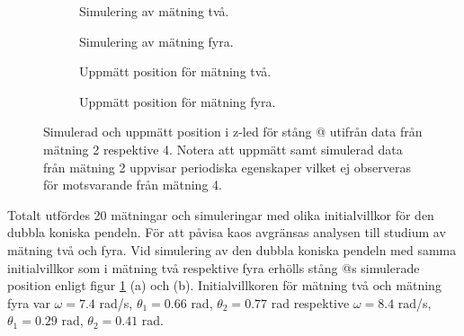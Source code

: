 \documentclass[12pt,a4paper]{article}
\makeatletter
\newlength\fheight
\newcommand*{\rom}[1]{\expandafter\@slowromancap\romannumeral #1@}
\makeatother
\begin{document}
\begin{figure}[H]
    \centering
    \begin{subfigure}[b]{0.49\textwidth}
        \centering
        \setlength\fheight{1.4in}
        
        \caption{Simulering av mätning två.}
    \end{subfigure}
    \hfill
    \begin{subfigure}[b]{0.49\textwidth}
        \centering
        \setlength\fheight{1.4in}
        
        \caption{Simulering av mätning fyra.}
    \end{subfigure}
    \caption*{} 

    \vspace{-17px}
    \centering
    \begin{subfigure}[b]{0.49\textwidth}
        \centering
        \setlength\fheight{1.4in}
        
        \caption{Uppmätt position för mätning två.}
    \end{subfigure}
    \hfill
    \begin{subfigure}[b]{0.49\textwidth}
        \centering
        \setlength\fheight{1.4in}
        
        \caption{Uppmätt position för mätning fyra.}
    \end{subfigure}
    \caption{Simulerad och uppmätt position i z-led för stång \rom{2} utifrån data från mätning 2 respektive 4. Notera att uppmätt samt simulerad data från mätning 2 uppvisar periodiska egenskaper vilket ej observeras för motsvarande från mätning 4. }
    \label{resultat:xuppgf1}
\end{figure}


Totalt utfördes 20 mätningar och simuleringar med olika initialvillkor för den dubbla koniska pendeln. För att påvisa kaos avgränsas analysen till studium av mätning två och fyra. Vid simulering av den dubbla koniska pendeln med samma initialvillkor som i mätning två respektive fyra erhölls stång \rom{2}s simulerade position enligt figur \ref{resultat:xuppgf1} (a) och (b). Initialvillkoren för mätning två och mätning fyra var $\omega = 7.4$ rad/s, $\theta_{1} = 0.66$ rad, $\theta_{2} = 0.77$ rad respektive $\omega = 8.4$ rad/s, $\theta_{1} = 0.29$ rad, $\theta_{2} = 0.41$ rad.
\end{document}

